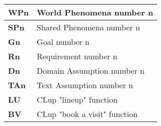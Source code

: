     \begin{center}
        {\renewcommand{\arraystretch}{2}%
        \begin{tabular}{L{2cm}L{12cm}}
            \hline
            \textbf{WPn} & World Phenomena number n \\
            \hline
            \textbf{SPn} & Shared Phenomena number n \\
            \hline
            \textbf{Gn} & Goal number n \\
            \hline
            \textbf{Rn} & Requirement number n \\
            \hline
            \textbf{Dn} & Domain Assumption number n \\
            \hline
            \textbf{TAn} & Text Assumption number n \\
            \hline
            \textbf{LU} & CLup "lineup" function \\
            \hline
            \textbf{BV} & CLup "book a visit" function \\
            \hline
        \end{tabular}}
    \end{center}